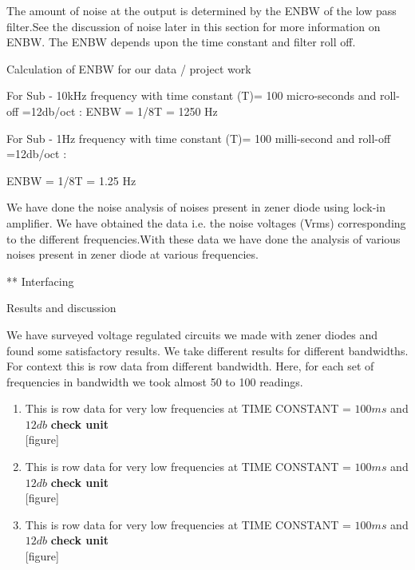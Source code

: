 \documentclass[final,5p,12pt,twocolumn]{elsaarticle}
\begin{document}
The amount of noise at the output is determined by the ENBW of the low pass filter.See the discussion of noise later in this section for more information on ENBW. The ENBW depends upon the time constant and filter roll off.

Calculation of ENBW for our data / project work
 
For Sub - 10kHz frequency with time constant (T)= 100 micro-seconds and roll-off =12db/oct :
       ENBW = 1/8T = 1250 Hz 

For Sub - 1Hz frequency with time constant       (T)= 100 milli-second and roll-off =12db/oct :

        ENBW = 1/8T = 1.25 Hz




We have done the noise analysis of noises present in zener diode using lock-in amplifier.
We have obtained the data i.e. the noise voltages (Vrms) corresponding to the different frequencies.With these data we have done the analysis of various noises present in zener diode at various frequencies.


** Interfacing

Results and discussion


We have surveyed voltage regulated circuits we made with zener diodes and found some satisfactory results. We take different results for different bandwidths. For context this is row data from different bandwidth. Here, for each set of frequencies in bandwidth we took almost 50 to 100 readings. 

\begin{enumerate}
\item This is row data for very low frequencies at TIME CONSTANT = $100ms$ and $12db$ \textbf{check unit}\\

[figure]\\

\item This is row data for very low frequencies at TIME CONSTANT = $100ms$ and $12db$ \textbf{check unit}\\

[figure]\\

\item This is row data for very low frequencies at TIME CONSTANT = $100ms$ and $12db$ \textbf{check unit}\\

[figure]

\end{enumerate}






















\end{document}
